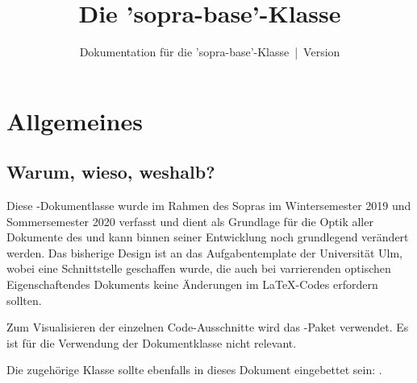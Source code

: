 \documentclass{sopra-base}
\title{Die 'sopra-base'-Klasse}
\subtitle[Dokumentation für die 'sopra-base'-Klasse]{Dokumentation für die 'sopra-base'-Klasse~|~Version \thesobversion}
\begin{document}
    \maketitle%
%
%

%
%
%
%

\section{Allgemeines}
\subsection{Warum, wieso, weshalb?}
    Diese \LaTeXe-Dokumentlasse wurde im Rahmen des Sopras im
    Wintersemester 2019 und Sommersemester 2020 verfasst und dient als
    Grundlage für die Optik aller Dokumente des  und kann
    binnen seiner Entwicklung noch grundlegend verändert werden. Das
    bisherige Design ist an das Aufgabentemplate der Universität Ulm, wobei
    eine Schnittstelle geschaffen wurde, die auch bei varrierenden optischen
    Eigenschaftendes Dokuments keine Änderungen im \LaTeX-Codes erfordern
    sollten.\par
    Zum Visualisieren der einzelnen Code-Ausschnitte wird das
    -Paket verwendet. Es ist für die Verwendung der Dokumentklasse
    nicht relevant.\par
    Die zugehörige Klasse sollte ebenfalls in dieses Dokument eingebettet sein: .
\end{document}
